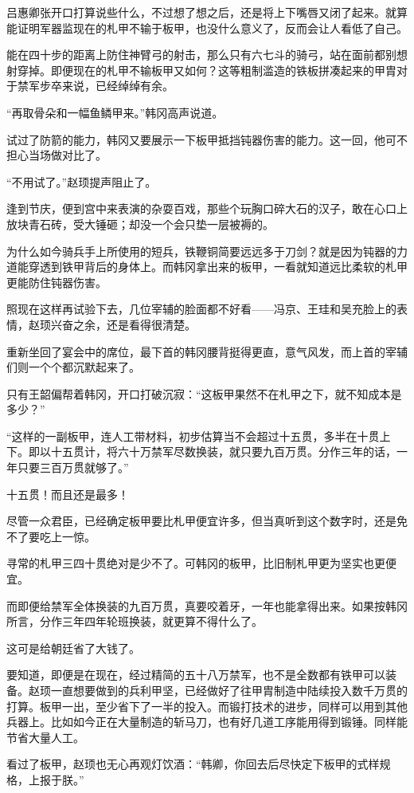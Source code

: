吕惠卿张开口打算说些什么，不过想了想之后，还是将上下嘴唇又闭了起来。就算能证明军器监现在的札甲不输于板甲，也没什么意义了，反而会让人看低了自己。

能在四十步的距离上防住神臂弓的射击，那么只有六七斗的骑弓，站在面前都别想射穿掉。即便现在的札甲不输板甲又如何？这等粗制滥造的铁板拼凑起来的甲胄对于禁军步卒来说，已经绰绰有余。

“再取骨朵和一幅鱼鳞甲来。”韩冈高声说道。

试过了防箭的能力，韩冈又要展示一下板甲抵挡钝器伤害的能力。这一回，他可不担心当场做对比了。

“不用试了。”赵顼提声阻止了。

逢到节庆，便到宫中来表演的杂耍百戏，那些个玩胸口碎大石的汉子，敢在心口上放块青石砖，受大锤砸；却没一个会只垫一层被褥的。

为什么如今骑兵手上所使用的短兵，铁鞭铜简要远远多于刀剑？就是因为钝器的力道能穿透到铁甲背后的身体上。而韩冈拿出来的板甲，一看就知道远比柔软的札甲更能防住钝器伤害。

照现在这样再试验下去，几位宰辅的脸面都不好看——冯京、王珪和吴充脸上的表情，赵顼兴奋之余，还是看得很清楚。

重新坐回了宴会中的席位，最下首的韩冈腰背挺得更直，意气风发，而上首的宰辅们则一个个都沉默起来了。

只有王韶偏帮着韩冈，开口打破沉寂：“这板甲果然不在札甲之下，就不知成本是多少？”

“这样的一副板甲，连人工带材料，初步估算当不会超过十五贯，多半在十贯上下。即以十五贯计，将六十万禁军尽数换装，就只要九百万贯。分作三年的话，一年只要三百万贯就够了。”

十五贯！而且还是最多！

尽管一众君臣，已经确定板甲要比札甲便宜许多，但当真听到这个数字时，还是免不了要吃上一惊。

寻常的札甲三四十贯绝对是少不了。可韩冈的板甲，比旧制札甲更为坚实也更便宜。

而即便给禁军全体换装的九百万贯，真要咬着牙，一年也能拿得出来。如果按韩冈所言，分作三年四年轮班换装，就更算不得什么了。

这可是给朝廷省了大钱了。

要知道，即便是在现在，经过精简的五十八万禁军，也不是全数都有铁甲可以装备。赵顼一直想要做到的兵利甲坚，已经做好了往甲胄制造中陆续投入数千万贯的打算。板甲一出，至少省下了一半的投入。而锻打技术的进步，同样可以用到其他兵器上。比如如今正在大量制造的斩马刀，也有好几道工序能用得到锻锤。同样能节省大量人工。

看过了板甲，赵顼也无心再观灯饮酒：“韩卿，你回去后尽快定下板甲的式样规格，上报于朕。”

